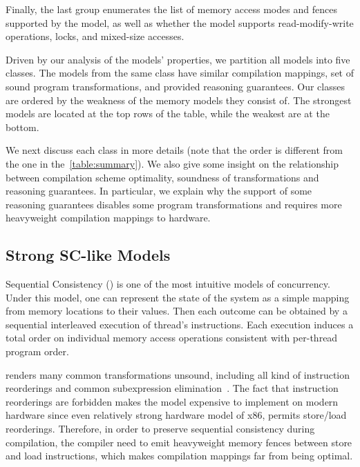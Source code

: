 Finally, the last group enumerates the list of memory access modes 
and fences supported by the model, as well as whether the model 
supports read-modify-write operations, locks, and mixed-size accesses.

Driven by our analysis of the models' properties, we partition all models into five classes. 
The models from the same class have similar compilation mappings, 
set of sound program transformations, and provided reasoning guarantees.
Our classes are ordered by the weakness of the memory models they consist of.  
The strongest models are located at the top rows of the table, 
while the weakest are at the bottom. 

We next discuss each class in more details
(note that the order is different from the one in the~\cref{table:summary}). 
We also give some insight on the relationship
between compilation scheme optimality, 
soundness of transformations and reasoning guarantees.
In particular, we explain why the support of some reasoning guarantees 
disables some program transformations and requires more heavyweight 
compilation mappings to hardware.

\subsection{Strong SC-like Models}

Sequential Consistency (\SC) is one of the most intuitive models of concurrency.
Under this model, one can represent the state of the system as 
a simple mapping from memory locations to their values. 
Then each outcome can be obtained by a sequential interleaved execution 
of thread's instructions. Each execution induces a total order 
on individual memory access operations consistent with per-thread program order. 

\SC renders many common transformations unsound, 
including all kind of instruction reorderings and 
common subexpression elimination~\cite{Marino-al:PLDI11, Sevcik-Aspinall:ECOOP08}.
The fact that instruction reorderings are forbidden 
makes the model expensive to implement on modern hardware
since even relatively strong hardware model of x86,
permits store/load reorderings.
Therefore, in order to preserve sequential consistency during compilation,
the compiler need to emit heavyweight memory fences between store and load instructions,
which makes compilation mappings far from being optimal.  

